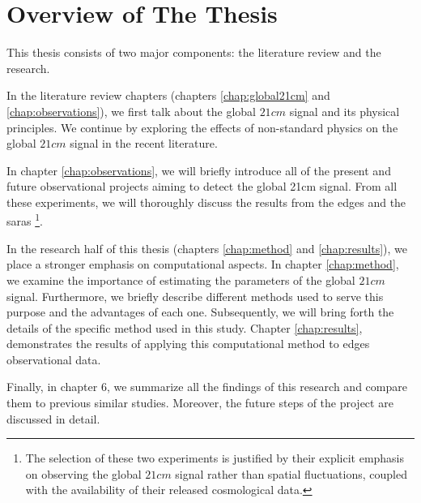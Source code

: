 \documentclass[12pt, TexShade, letterpaper]{report}
\begin{document}
\section{Overview of The Thesis}
This thesis consists of two major components: the literature review and the research.\par
In the literature review chapters (chapters \ref{chap:global21cm} and \ref{chap:observations}), we first talk about the global $21cm$ signal and its physical principles. We continue by exploring the effects of non-standard physics on the global $21cm$ signal in the recent literature. \par
In chapter \ref{chap:observations}, we will briefly introduce all of the present and future observational projects aiming to detect the global 21cm signal. From all these experiments, we will thoroughly discuss the results from the \gls{edges} \cite{edges} and the \gls{saras} \cite{saras_1} \footnote{The selection of these two experiments is justified by their explicit emphasis on observing the global $21cm$ signal rather than spatial fluctuations, coupled with the availability of their released cosmological data.}.\par
In the research half of this thesis (chapters \ref{chap:method} and \ref{chap:results}), we place a stronger emphasis on computational aspects. 
In chapter \ref{chap:method}, we examine the importance of estimating the parameters of the global $21cm$ signal. Furthermore, we briefly describe different methods used to serve this purpose and the advantages of each one. Subsequently, we will bring forth the details of the specific method used in this study. Chapter \ref{chap:results}, demonstrates the results of applying this computational method to \gls{edges} observational data.\par
Finally, in chapter 6, we summarize all the findings of this research and compare them to previous similar studies. Moreover, the future steps of the project are discussed in detail.\par

\end{document}
